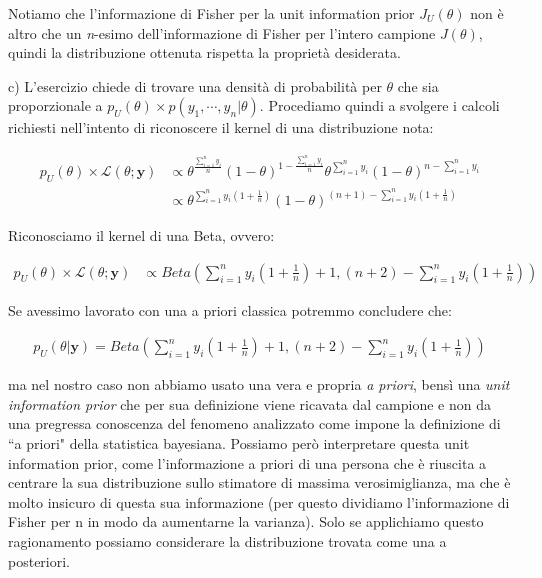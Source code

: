 Notiamo che l'informazione di Fisher per la unit information prior $J_U(\theta)$ non è altro che un \textit{n}-esimo dell'informazione di Fisher per l'intero campione $J(\theta)$, quindi la distribuzione ottenuta rispetta la proprietà desiderata.

\bigskip
c)  L'esercizio chiede di trovare una densità di probabilità per $\theta$ che sia proporzionale a $p_U(\theta) \times p(y_1,\cdots,y_n|\theta)$. Procediamo quindi a svolgere i calcoli richiesti nell'intento di riconoscere il kernel di una distribuzione nota:

\begin{align*}
p_U(\theta) \times \mathcal{L}(\theta;\textbf{y}) &\propto
\theta^\frac{\sum_{i=1}^n y_i}{n} 
(1-\theta)^{1-\frac{\sum_{i=1}^n y_i}{n}} 
\theta^ {\sum_{i=1}^n y_i}
(1-\theta)^{n-\sum_{i=1}^n y_i}\\
&\propto \theta^{\sum_{i=1}^n y_i(1+\frac{1}{n}) }
(1-\theta)^{(n+1) - \sum_{i=1}^n y_i (1+\frac{1}{n}) }
\end{align*}

Riconosciamo il kernel di una Beta, ovvero:


\begin{align*}
p_U(\theta) \times \mathcal{L}(\theta;\textbf{y}) &\propto 
Beta
\left( 
\sum_{i=1}^n y_i\left(1+\frac{1}{n}\right)  + 1, 
(n+2) - \sum_{i=1}^n y_i \left(1+\frac{1}{n}\right) 
\right)
\end{align*}

Se avessimo lavorato con una a priori classica potremmo  concludere che:

\begin{align*}
p_U(\theta|\textbf{y}) =
Beta
\left( 
\sum_{i=1}^n y_i\left(1+\frac{1}{n}\right)  + 1, 
(n+2) - \sum_{i=1}^n y_i \left(1+\frac{1}{n}\right) 
\right)
\end{align*}

ma nel nostro caso non abbiamo usato una vera e propria \textit{a priori}, bensì una \textit{unit information prior} che per sua definizione viene ricavata dal campione e non da una pregressa conoscenza del fenomeno analizzato come impone la definizione di ``a priori" della statistica bayesiana. Possiamo però interpretare questa unit information prior, come l’informazione a priori di una persona che è riuscita a centrare la sua distribuzione sullo stimatore di massima verosimiglianza, ma che è molto insicuro di questa sua informazione (per questo dividiamo l’informazione di Fisher per n in modo da aumentarne la varianza). Solo se applichiamo questo ragionamento possiamo considerare la distribuzione trovata come una a posteriori.

